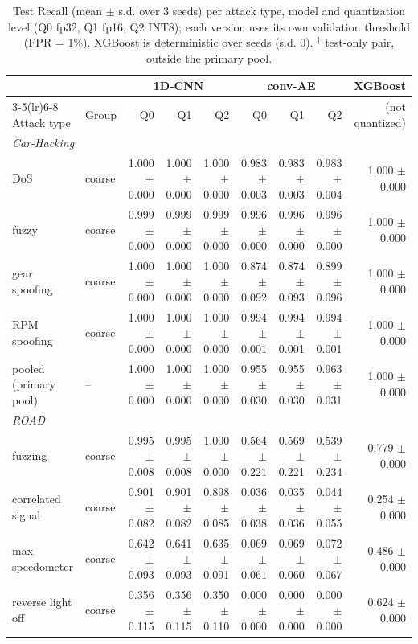 \begin{table}[t]
\centering
\footnotesize
\setlength{\tabcolsep}{3pt}
\caption{Test Recall (mean $\pm$ s.d. over 3 seeds) per attack type, model and quantization level (Q0 fp32, Q1 fp16, Q2 INT8); each version uses its own validation threshold (FPR = 1\%). XGBoost is deterministic over seeds (s.d. 0). $^\dagger$ test-only pair, outside the primary pool.}
\label{tab:recall}
\begin{tabular}{@{}llrrrrrrr@{}}
\toprule
& & \multicolumn{3}{c}{1D-CNN} & \multicolumn{3}{c}{conv-AE} & XGBoost \\
\cmidrule(lr){3-5}\cmidrule(lr){6-8}
Attack type & Group & Q0 & Q1 & Q2 & Q0 & Q1 & Q2 & (not quantized) \\
\midrule
\multicolumn{9}{l}{\textit{Car-Hacking}} \\
DoS & coarse & 1.000 $\pm$ 0.000 & 1.000 $\pm$ 0.000 & 1.000 $\pm$ 0.000 & 0.983 $\pm$ 0.003 & 0.983 $\pm$ 0.003 & 0.983 $\pm$ 0.004 & 1.000 $\pm$ 0.000 \\
fuzzy & coarse & 0.999 $\pm$ 0.000 & 0.999 $\pm$ 0.000 & 0.999 $\pm$ 0.000 & 0.996 $\pm$ 0.000 & 0.996 $\pm$ 0.000 & 0.996 $\pm$ 0.000 & 1.000 $\pm$ 0.000 \\
gear spoofing & coarse & 1.000 $\pm$ 0.000 & 1.000 $\pm$ 0.000 & 1.000 $\pm$ 0.000 & 0.874 $\pm$ 0.092 & 0.874 $\pm$ 0.093 & 0.899 $\pm$ 0.096 & 1.000 $\pm$ 0.000 \\
RPM spoofing & coarse & 1.000 $\pm$ 0.000 & 1.000 $\pm$ 0.000 & 1.000 $\pm$ 0.000 & 0.994 $\pm$ 0.001 & 0.994 $\pm$ 0.001 & 0.994 $\pm$ 0.001 & 1.000 $\pm$ 0.000 \\
pooled (primary pool) & -- & 1.000 $\pm$ 0.000 & 1.000 $\pm$ 0.000 & 1.000 $\pm$ 0.000 & 0.955 $\pm$ 0.030 & 0.955 $\pm$ 0.030 & 0.963 $\pm$ 0.031 & 1.000 $\pm$ 0.000 \\
\midrule
\multicolumn{9}{l}{\textit{ROAD}} \\
fuzzing & coarse & 0.995 $\pm$ 0.008 & 0.995 $\pm$ 0.008 & 1.000 $\pm$ 0.000 & 0.564 $\pm$ 0.221 & 0.569 $\pm$ 0.221 & 0.539 $\pm$ 0.234 & 0.779 $\pm$ 0.000 \\
correlated signal & coarse & 0.901 $\pm$ 0.082 & 0.901 $\pm$ 0.082 & 0.898 $\pm$ 0.085 & 0.036 $\pm$ 0.038 & 0.035 $\pm$ 0.036 & 0.044 $\pm$ 0.055 & 0.254 $\pm$ 0.000 \\
max speedometer & coarse & 0.642 $\pm$ 0.093 & 0.641 $\pm$ 0.093 & 0.635 $\pm$ 0.091 & 0.069 $\pm$ 0.061 & 0.069 $\pm$ 0.060 & 0.072 $\pm$ 0.067 & 0.486 $\pm$ 0.000 \\
reverse light off & coarse & 0.356 $\pm$ 0.115 & 0.356 $\pm$ 0.115 & 0.350 $\pm$ 0.110 & 0.000 $\pm$ 0.000 & 0.000 $\pm$ 0.000 & 0.000 $\pm$ 0.000 & 0.624 $\pm$ 0.000 \\

\end{tabular}
\end{table}
